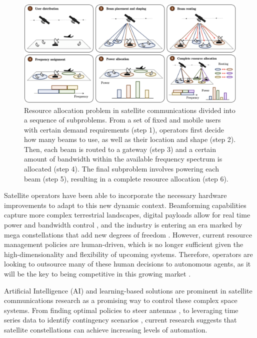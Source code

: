 \documentclass[letterpaper]{article} %
\begin{document}
\begin{figure}[t]
\begin{center}
\includegraphics[width=0.95\linewidth]{pics/problem_diagram.png}
\end{center}
\caption{Resource allocation problem in satellite communications divided into a sequence of subproblems. From a set of fixed and mobile users with certain demand requirements (step 1), operators first decide how many beams to use, as well as their location and shape (step 2). Then, each beam is routed to a gateway (step 3) and a certain amount of bandwidth within the available frequency spectrum is allocated (step 4). The final subproblem involves powering each beam (step 5), resulting in a complete resource allocation (step 6).}
\label{fig:ProblemDiagram}
\end{figure}

Satellite operators have been able to incorporate the necessary hardware improvements to adapt to this new dynamic context. Beamforming capabilities capture more complex terrestrial landscapes, digital payloads allow for real time power and bandwidth control \cite{Balty2009, Angeletti2008}, and the industry is entering an era marked by mega constellations that add new degrees of freedom \cite{Vidal2021}. However, current resource management policies are human-driven, which is no longer sufficient given the high-dimensionality and flexibility of upcoming systems. Therefore, operators are looking to outsource many of these human decisions to autonomous agents, as it will be the key to being competitive in this growing market \cite{Coleman2019}.

Artificial Intelligence (AI) and learning-based solutions are prominent in satellite communications research as a promising way to control these complex space systems. From finding optimal policies to steer antennas \cite{Abbas2015}, to leveraging time series data to identify contingency scenarios \cite{Ackerman2020}, current research suggests that satellite constellations can achieve increasing levels of automation.
\end{document}

